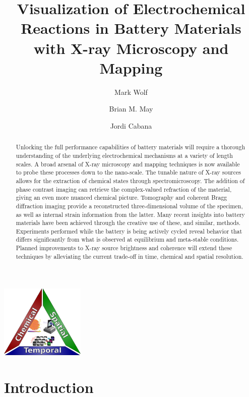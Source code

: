 \documentclass[journal=cmatex,manuscript=perspective]{achemso}
\author{Mark Wolf}
\author{Brian M. May}
\author{Jordi Cabana}
\affiliation[University of Illinois at Chicago]
{Department of Chemistry, University of Illinois at Chicago, Chicago IL}
\title{Visualization of Electrochemical Reactions in Battery Materials
  with X-ray Microscopy and Mapping}
\begin{document}
\begin{tocentry}
  \includegraphics[height=1.375in]{resolution-triangle.png}
\end{tocentry}

\begin{abstract}
  Unlocking the full performance capabilities of battery materials
  will require a thorough understanding of the underlying
  electrochemical mechanisms at a variety of length scales. A broad
  arsenal of X-ray microscopy and mapping techniques is now available
  to probe these processes down to the nano-scale. The tunable nature
  of X-ray sources allows for the extraction of chemical states
  through spectromicroscopy. The addition of phase contrast imaging
  can retrieve the complex-valued refraction of the material, giving
  an even more nuanced chemical picture. Tomography and coherent Bragg
  diffraction imaging provide a reconstructed three-dimensional volume
  of the specimen, as well as internal strain information from the
  latter. Many recent insights into battery materials have been
  achieved through the creative use of these, and similar,
  methods. Experiments performed while the battery is being actively
  cycled reveal behavior that differs significantly from what is
  observed at equilibrium and meta-stable conditions. Planned
  improvements to X-ray source brightness and coherence will extend
  these techniques by alleviating the current trade-off in time,
  chemical and spatial resolution.
\end{abstract}

\section{Introduction}
\end{document}
